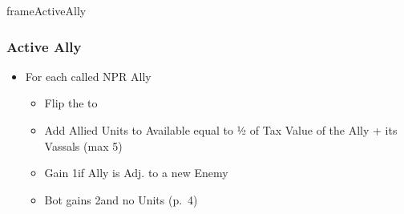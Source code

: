 \documentclass[10pt]{article}
\newlength{\fhActiveAlly} \setlength\fhActiveAlly{8\baselineskip}
\begin{document}
\begin{dynamiccontents*}{frameActiveAlly}\begin{eubox}{\fhActiveAlly}
	\subsubsection*{Active Ally }
	\begin{itemize}
		\item For each called NPR Ally
		\begin{itemize}
			\item Flip the \alliance to \activeally
			\item Add Allied Units to Available \manpower equal to ½ of Tax Value of the Ally + its Vassals (max 5)
			\item Gain 1\milpower if Ally is Adj. to a new Enemy
		\end{itemize}
		{\botrules
		\begin{itemize}
			\item Bot gains 2\botpower and no Units (p.~4)
		\end{itemize}
		}
	\end{itemize}
\end{eubox}\end{dynamiccontents*}
\end{document}
